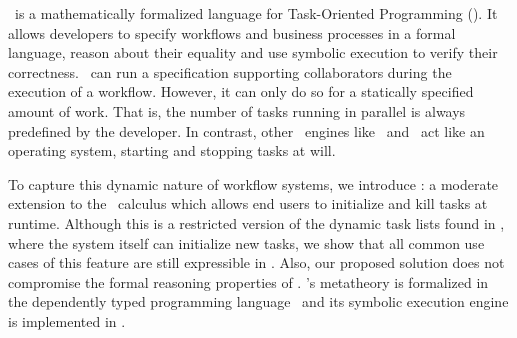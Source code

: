 %
%
\TOPHAT\ is a mathematically formalized language for Task-Oriented Programming (\TOP).
It allows developers to specify workflows and business processes in a formal language,
reason about their equality
and use symbolic execution to verify their correctness.
\TOPHAT\ can run a specification supporting collaborators during the execution of a workflow.
However, it can only do so for a statically specified amount of work.
That is, the number of tasks running in parallel is always predefined by the developer.
In contrast, other \TOP\ engines like \ITASKS\ and \MTASKS\ act like an operating system,
starting and stopping tasks at will.

To capture this dynamic nature of workflow systems,
we introduce \DYNTOPHAT:
a moderate extension to the \TOPHAT\ calculus which allows end users to initialize and kill tasks at runtime.
Although this is a restricted version of the dynamic task lists found in \ITASKS,
where the system itself can initialize new tasks,
we show that all common use cases of this feature are still expressible in \DYNTOPHAT.
Also, our proposed solution does not compromise the formal reasoning properties of \TOPHAT.
\TOPHAT's metatheory is formalized in the dependently typed programming language \IDRIS\
and its symbolic execution engine is implemented in \HASKELL.



